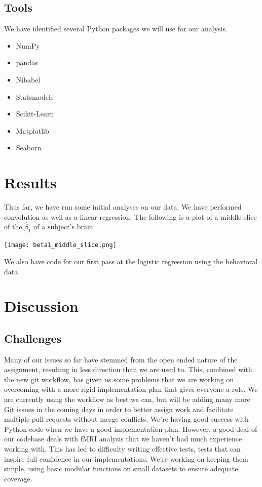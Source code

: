 \documentclass[11pt]{article}
\begin{document}
\subsection{Tools}

We have identified several Python packages we will use for our analysis.

\begin{itemize}
  \item{NumPy}
  \item{pandas}
  \item{Nibabel}
  \item{Statsmodels}
  \item{Scikit-Learn}
  \item{Matplotlib}
  \item{Seaborn}
\end{itemize}

\section{Results}

Thus far, we have run some initial analyses on our data. We have performed
convolution as well as a linear regression. The following is a plot of a middle
slice of the $\hat{\beta}_1$ of a subject's brain.

\texttt{[image: beta1\_middle\_slice.png]}

We also have code for our first pass at the logistic regression using the
behavioral data.

\section{Discussion}

\subsection{Challenges}

Many of our issues so far have stemmed from the open ended nature of the
assignment, resulting in less direction than we are used to. This, combined
with the new git workflow, has given us some problems that we are working on
overcoming with a more rigid implementation plan that gives everyone a role.
We are currently using the workflow as best we can, but will be adding many
more Git issues in the coming days in order to better assign work and
facilitate multiple pull requests without merge conflicts. We're having good
success with Python code when we have a good implementation plan. However, a
good deal of our codebase deals with fMRI analysis that we haven't had much
experience working with. This has led to difficulty writing effective tests,
tests that can inspire full confidence in our implementations. We're working on
keeping them simple, using basic modular functions on small datasets to ensure
adequate coverage.
\end{document}

